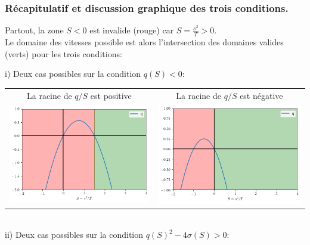 \documentclass[11pt]{article}
\begin{document}
\subsubsection{Récapitulatif et discussion graphique des trois conditions.}
Partout, la zone $S<0$ est invalide (rouge) car $S=\frac{s^2}{T}>0$.\\
Le domaine des vitesses possible est alors l'intersection des domaines valides (verts) pour les trois conditions:

i) Deux cas possibles sur la condition $q(S)<0$:\\


\begin{tabular}{cc}
 La racine de $q/S$ est positive & La racine de $q/S$ est négative \\
\includegraphics[width=.47\textwidth]{Images/qcas1.png} & \includegraphics[width=.47\textwidth]{Images/qcas2.png} \\
\end{tabular}
\\
ii) Deux cas possibles sur la condition $q(S)^2-4\sigma(S)>0$:\\
\end{document}
